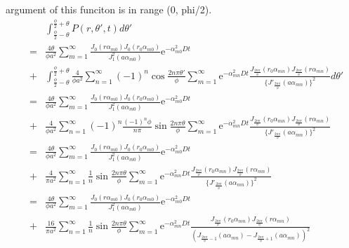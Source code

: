 \documentclass{article}
\begin{document}
    argument of this funciton is in range (0, phi/2).
\begin{eqnarray}
    & & \int^{\frac{\phi}{2} + \theta}_{\frac{\phi}{2} - \theta}
       P(r, \theta', t) d\theta' \nonumber\\
    &=& \frac{4\theta}{\phi a^2} \sum^{\infty}_{m=1}
        \frac{J_0(r\alpha_{m0}) J_0(r_0\alpha_{m0})}
             {J^2_1(a\alpha_{m0})}
        \mathrm{e}^{-\alpha^2_{m0}Dt} \nonumber \\
    &+& \int^{\frac{\phi}{2} + \theta}_{\frac{\phi}{2} - \theta}
        \frac{4}{\phi a^2}\sum^{\infty}_{n=1}
        (-1)^n\cos\frac{2n\pi\theta'}{\phi}
        \sum^{\infty}_{m=1}
        \mathrm{e}^{-\alpha_{mn}^2Dt}
        \frac{J_{\frac{2n\pi}{\phi}}(r_0\alpha_{mn})
              J_{\frac{2n\pi}{\phi}}(r\alpha_{mn})}
             {\{J'_{\frac{2n\pi}{\phi}}(a\alpha_{mn})\}^2}
        d\theta' \nonumber \\
    &=& \frac{4\theta}{\phi a^2} \sum^{\infty}_{m=1}
        \frac{J_0(r\alpha_{m0}) J_0(r_0\alpha_{m0})}
             {J^2_1(a\alpha_{m0})}
        \mathrm{e}^{-\alpha^2_{m0}Dt} \nonumber \\
    &+& \frac{4}{\phi a^2}\sum^{\infty}_{n=1}
        (-1)^n\frac{(-1)^n\phi}{n\pi}\sin\frac{2n\pi\theta}{\phi}
        \sum^{\infty}_{m=1}
        \mathrm{e}^{-\alpha_{mn}^2Dt}
        \frac{J_{\frac{2n\pi}{\phi}}(r_0\alpha_{mn})
              J_{\frac{2n\pi}{\phi}}(r\alpha_{mn})}
             {\{J'_{\frac{2n\pi}{\phi}}(a\alpha_{mn})\}^2}
             \nonumber\\
    &=& \frac{4\theta}{\phi a^2} \sum^{\infty}_{m=1}
        \frac{J_0(r\alpha_{m0}) J_0(r_0\alpha_{m0})}
             {J^2_1(a\alpha_{m0})}
        \mathrm{e}^{-\alpha^2_{m0}Dt} \nonumber \\
    &+& \frac{4}{\pi a^2}\sum^{\infty}_{n=1}
        \frac{1}{n}\sin\frac{2n\pi\theta}{\phi}
        \sum^{\infty}_{m=1}
        \mathrm{e}^{-\alpha_{mn}^2Dt}
        \frac{J_{\frac{2n\pi}{\phi}}(r_0\alpha_{mn})
              J_{\frac{2n\pi}{\phi}}(r\alpha_{mn})}
             {\{J'_{\frac{2n\pi}{\phi}}(a\alpha_{mn})\}^2}\nonumber\\
    &=& \frac{4\theta}{\phi a^2} \sum^{\infty}_{m=1}
        \frac{J_0(r\alpha_{m0}) J_0(r_0\alpha_{m0})}
             {J^2_1(a\alpha_{m0})}
        \mathrm{e}^{-\alpha^2_{m0}Dt} \nonumber \\
    &+& \frac{16}{\pi a^2}\sum^{\infty}_{n=1}
        \frac{1}{n}\sin\frac{2n\pi\theta}{\phi}
        \sum^{\infty}_{m=1}
        \mathrm{e}^{-\alpha_{mn}^2Dt}
        \frac{J_{\frac{2n\pi}{\phi}}(r_0\alpha_{mn})
              J_{\frac{2n\pi}{\phi}}(r\alpha_{mn})}
             {(J_{\frac{2n\pi}{\phi} - 1}(a\alpha_{mn})
             - J_{\frac{2n\pi}{\phi} + 1}(a\alpha_{mn}))^2}
        \nonumber
\end{eqnarray}
\end{document}

